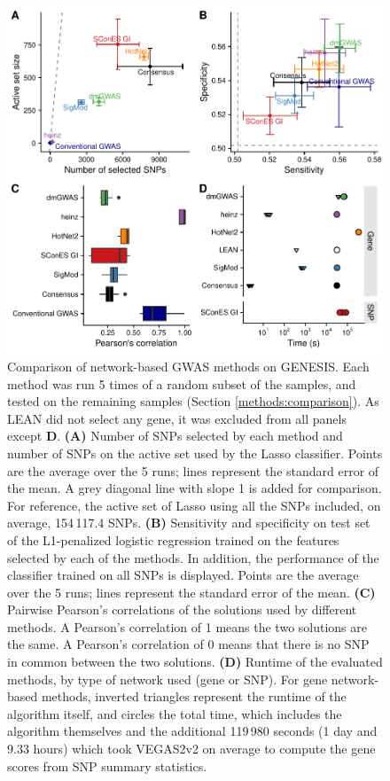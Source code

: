 \documentclass[twocolumn, 11pt]{article}
\begin{document}
\begin{figure}[htbp]
\centering
\includegraphics[width=.72\linewidth]{./figures/figure_4.pdf}
\caption{\label{fig:benchmark}
Comparison of network-based GWAS methods on GENESIS. Each method was run 5 times of a random subset of the samples, and tested on the remaining samples (Section \ref{methods:comparison}). As LEAN did not select any gene, it was excluded from all panels except \textbf{D}. \textbf{(A)} Number of SNPs selected by each method and number of SNPs on the active set used by the Lasso classifier. Points are the average over the 5 runs; lines represent the standard error of the mean. A grey diagonal line with slope 1 is added for comparison. For reference, the active set of Lasso using all the SNPs included, on average, 154\,117.4 SNPs. \textbf{(B)} Sensitivity and specificity on test set of the L1-penalized logistic regression trained on the features selected by each of the methods. In addition, the performance of the classifier trained on all SNPs is displayed. Points are the average over the 5 runs; lines represent the standard error of the mean. \textbf{(C)} Pairwise Pearson's correlations of the solutions used by different methods. A Pearson's correlation of 1 means the two solutions are the same. A Pearson's correlation of 0 means that there is no SNP in common between the two solutions. \textbf{(D)} Runtime of the evaluated methods, by type of network used (gene or SNP). For gene network-based methods, inverted triangles represent the runtime of the algorithm itself, and circles the total time, which includes the algorithm themselves and the additional 119\,980 seconds (1 day and 9.33 hours) which took VEGAS2v2 on average to compute the gene scores from SNP summary statistics.}
\end{figure}
\end{document}
